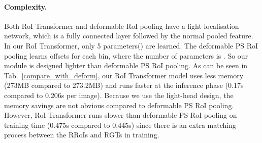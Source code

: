 \documentclass[11pt,onecolumn]{article}         \usepackage[top=3.6cm, bottom=3.2cm, left=2.3cm, right=2.3cm]{geometry}
\begin{document}
\vspace{-2mm}
\paragraph{Complexity.} Both RoI Transformer and deformable RoI pooling have a light localisation network, which is a fully connected layer followed by the normal pooled feature. In our RoI Transformer, only 5 parameters() are learned.
The deformable PS RoI pooling learns offsets for each bin, where the number of parameters is  . So our module is designed lighter than deformable PS RoI pooling. As can be seen in Tab.~\ref{compare_with_deform}, our RoI Transformer model uses less memory (273MB compared to 273.2MB) and runs faster at the inference phase (0.17s compared to 0.206s per image). Because we use the light-head design, the memory savings are not obvious compared to deformable PS RoI pooling. 
However, RoI Transformer runs slower than deformable PS RoI pooling on training time (0.475s compared to 0.445s) since there is an extra matching process between the RRoIs and RGTs in training.

\vspace{-2mm}
\end{document}
